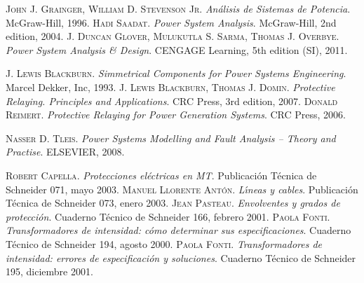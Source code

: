 \begin{thebibliography}{99}
     \textsc{John J. Grainger, William D. Stevenson Jr}. \textsl{An\'{a}lisis de Sistemas de Potencia}.  McGraw-Hill, 1996.
     \textsc{Hadi Saadat}. \textsl{Power System Analysis}.  McGraw-Hill, 2nd edition, 2004.
     \textsc{J. Duncan Glover, Mulukutla S. Sarma, Thomas J. Overbye}. \textsl{Power System Analysis \& Design}.  CENGAGE Learning, 5th edition (SI), 2011.

     \textsc{J. Lewis Blackburn}. \textsl{Simmetrical Components for Power Systems Engineering}.  Marcel Dekker, Inc, 1993.
     \textsc{J. Lewis Blackburn, Thomas J. Domin}. \textsl{Protective Relaying. Principles and Applications}.  CRC Press, 3rd edition, 2007.
     \textsc{Donald Reimert}. \textsl{Protective Relaying for Power Generation Systems}.  CRC Press, 2006.


     \textsc{Nasser D. Tleis}. \textsl{Power Systems Modelling and Fault Analysis -- Theory and Practise}.  ELSEVIER, 2008.


     \textsc{Robert Capella}. \textsl{Protecciones el\'{e}ctricas en MT}.  Publicaci\'{o}n T\'{e}cnica de Schneider 071, mayo 2003.
     \textsc{Manuel Llorente Ant\'{o}n}. \textsl{L\'{\i}neas y cables}.  Publicaci\'{o}n T\'{e}cnica de Schneider 073, enero 2003.
     \textsc{Jean Pasteau}. \textsl{Envolventes y grados de protecci\'{o}n}.  Cuaderno T\'{e}cnico de Schneider 166, febrero 2001.
     \textsc{Paola Fonti}. \textsl{Transformadores de intensidad: c\'{o}mo determinar sus especificaciones}.  Cuaderno T\'{e}cnico de Schneider 194, agosto 2000.
     \textsc{Paola Fonti}. \textsl{Transformadores de intensidad: errores de especificaci\'{o}n y soluciones}.  Cuaderno T\'{e}cnico de Schneider 195, diciembre 2001.

\end{thebibliography} 